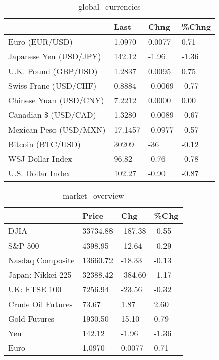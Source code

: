 \documentclass{article}%
\begin{document}
%


\begin{table}[htbp]%
\caption{global\_currencies}%
\centering%
\begin{adjustbox}{width=1\textwidth}%
\begin{tabular}{llll}
\toprule
                       &    Last &    Chng & \%Chng \\
\midrule
        Euro (EUR/USD) &  1.0970 &  0.0077 &  0.71 \\
Japanese Yen (USD/JPY) &  142.12 &   -1.96 & -1.36 \\
  U.K. Pound (GBP/USD) &  1.2837 &  0.0095 &  0.75 \\
 Swiss Franc (USD/CHF) &  0.8884 & -0.0069 & -0.77 \\
Chinese Yuan (USD/CNY) &  7.2212 &  0.0000 &  0.00 \\
  Canadian \$ (USD/CAD) &  1.3280 & -0.0089 & -0.67 \\
Mexican Peso (USD/MXN) & 17.1457 & -0.0977 & -0.57 \\
     Bitcoin (BTC/USD) &   30209 &     -36 & -0.12 \\
      WSJ Dollar Index &   96.82 &   -0.76 & -0.78 \\
     U.S. Dollar Index &  102.27 &   -0.90 & -0.87 \\
\bottomrule
\end{tabular}
%
\end{adjustbox}%
\end{table}

%


\begin{table}[htbp]%
\caption{market\_overview}%
\centering%
\begin{adjustbox}{width=1\textwidth}%
\begin{tabular}{llll}
\toprule
                  &    Price &     Chg &  \%Chg \\
\midrule
             DJIA & 33734.88 & -187.38 & -0.55 \\
          S\&P 500 &  4398.95 &  -12.64 & -0.29 \\
 Nasdaq Composite & 13660.72 &  -18.33 & -0.13 \\
Japan: Nikkei 225 & 32388.42 & -384.60 & -1.17 \\
     UK: FTSE 100 &  7256.94 &  -23.56 & -0.32 \\
Crude Oil Futures &    73.67 &    1.87 &  2.60 \\
     Gold Futures &  1930.50 &   15.10 &  0.79 \\
              Yen &   142.12 &   -1.96 & -1.36 \\
             Euro &   1.0970 &  0.0077 &  0.71 \\
\bottomrule
\end{tabular}
%
\end{adjustbox}%
\end{table}

%
\end{document}
